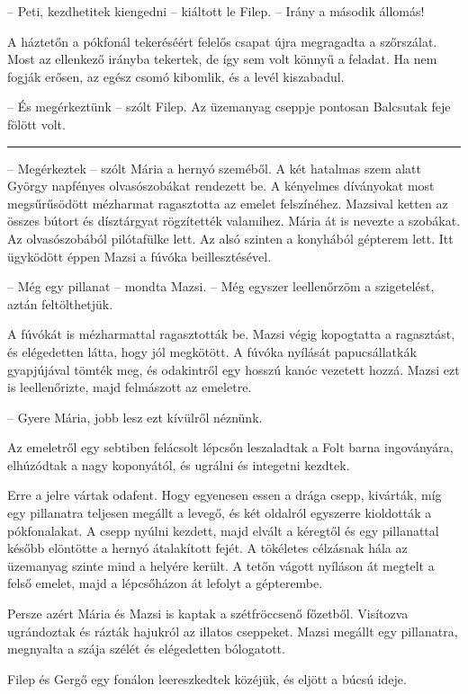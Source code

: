 \documentclass[10pt]{memoir}
\renewcommand{\pfbreakdisplay}{\bigskip \ding{166} \bigskip}
\newcommand{\secbreak}{\fancybreak{\pfbreakdisplay}\indent}
\begin{document}
-- Peti, kezdhetitek kiengedni -- kiáltott le Filep. -- Irány a második
állomás!

A háztetőn a pókfonál tekeréséért felelős csapat újra megragadta a szőrszálat.
Most az ellenkező irányba tekertek, de így sem volt könnyű a feladat. Ha nem
fogják erősen, az egész csomó kibomlik, és a levél kiszabadul.

-- És megérkeztünk -- szólt Filep. Az üzemanyag cseppje pontosan Balcsutak
feje fölött volt.

\secbreak

-- Megérkeztek -- szólt Mária a hernyó szeméből. A két hatalmas szem alatt
György napfényes olvasószobákat rendezett be. A kényelmes díványokat most
megsűrűsödött mézharmat ragasztotta az emelet felszínéhez. Mazsival ketten az
összes bútort és dísztárgyat rögzítették valamihez. Mária át is nevezte a
szobákat. Az olvasószobából pilótafülke lett. Az alsó szinten a konyhából
gépterem lett. Itt ügyködött éppen Mazsi a fúvóka beillesztésével.

-- Még egy pillanat -- mondta Mazsi. -- Még egyszer leellenőrzöm a
szigetelést, aztán feltölthetjük.

A fúvókát is mézharmattal ragasztották be. Mazsi végig kopogtatta a ragasztást,
és elégedetten látta, hogy jól megkötött. A fúvóka nyílását papucsállatkák
gyapjújával tömték meg, és odakintről egy hosszú kanóc vezetett hozzá. Mazsi
ezt is leellenőrizte, majd felmászott az emeletre.

-- Gyere Mária, jobb lesz ezt kívülről néznünk.

Az emeletről egy sebtiben felácsolt lépcsőn leszaladtak a Folt barna
ingoványára, elhúzódtak a nagy koponyától, és ugrálni és integetni kezdtek.

Erre a jelre vártak odafent. Hogy egyenesen essen a drága csepp, kivárták, míg
egy pillanatra teljesen megállt a levegő, és két oldalról egyszerre kioldották
a pókfonalakat. A csepp nyúlni kezdett, majd elvált a kéregtől és egy
pillanattal később elöntötte a hernyó átalakított fejét. A tökéletes célzásnak
hála az üzemanyag szinte mind a helyére került. A tetőn vágott nyíláson át
megtelt a felső emelet, majd a lépcsőházon át lefolyt a gépterembe.

Persze azért Mária és Mazsi is kaptak a szétfröccsenő főzetből. Visítozva
ugrándoztak és rázták hajukról az illatos cseppeket. Mazsi megállt egy
pillanatra, megnyalta a szája szélét és elégedetten bólogatott.

Filep és Gergő egy fonálon leereszkedtek közéjük, és eljött a búcsú ideje.
\end{document}
